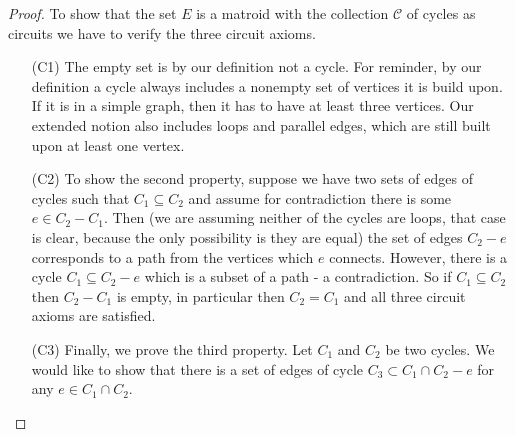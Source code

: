 \begin{proof}

To show that the set $E$ is a matroid with the collection $\mathcal{C}$ of cycles as circuits we have to verify the three circuit axioms. 

\begin{enumerate}

\item[(C1)] The empty set is by our definition not a cycle. For reminder, by our definition a cycle always includes a nonempty set of vertices it is build upon. If it is in a simple graph, then it has to have at least three vertices. Our extended notion also includes loops and parallel edges, which are still built upon at least one vertex. 

\item[(C2)] To show the second property, suppose we have two sets of edges of cycles such that $C_1 \subseteq C_2$ and assume for contradiction there is some $e \in C_2 - C_1$. Then (we are assuming neither of the cycles are loops, that case is clear, because the only possibility is they are equal) the set of edges $C_2 - e$ corresponds to a path from the vertices which $e$ connects. However, there is a cycle $C_1 \subseteq C_2 -e$ which is a subset of a path - a contradiction. So if $C_1 \subseteq C_2$ then $C_2 - C_1$ is empty, in particular then $C_2 = C_1$ and all three circuit axioms are satisfied.



    
   \item[(C3)] Finally, we prove the third property. Let $C_1$ and $C_2$ be two cycles. We would like to show that there is a set of edges of cycle $C_3 \subset C_1 \cap C_2 - e$ for any $e \in C_1 \cap C_2$.
 


\end{enumerate}
\end{proof}
